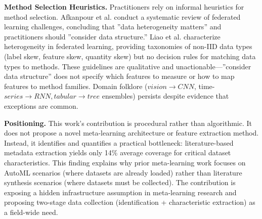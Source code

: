 \textbf{Method Selection Heuristics.} Practitioners rely on informal heuristics for method selection. Afkanpour et al. conduct a systematic review of federated learning challenges, concluding that ''data heterogeneity matters'' and practitioners should ''consider data structure.'' Liao et al. characterize heterogeneity in federated learning, providing taxonomies of non-IID data types (label skew, feature skew, quantity skew) but no decision rules for matching data types to methods. These guidelines are qualitative and unactionable---''consider data structure'' does not specify which features to measure or how to map features to method families. Domain folklore ($vision\rightarrow CNN$, time-$series\rightarrow RNN, tabular\rightarrow tree$ ensembles) persists despite evidence that exceptions are common.

\textbf{Positioning.} This work's contribution is procedural rather than algorithmic. It does not propose a novel meta-learning architecture or feature extraction method. Instead, it identifies and quantifies a practical bottleneck: literature-based metadata extraction yields only 14\% average coverage for critical dataset characteristics. This finding explains why prior meta-learning work focuses on AutoML scenarios (where datasets are already loaded) rather than literature synthesis scenarios (where datasets must be collected). The contribution is exposing a hidden infrastructure assumption in meta-learning research and proposing two-stage data collection (identification + characteristic extraction) as a field-wide need.
